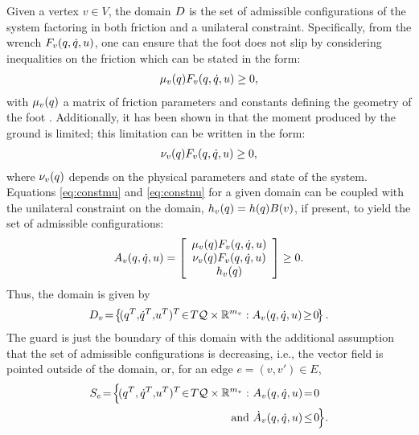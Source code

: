 Given a vertex $v \in V$, the domain $D$ is the set of admissible configurations of the system factoring in both friction and a unilateral constraint.
%
Specifically, from the wrench $F_{v}(q, \dot{q}, u)$, one can ensure that the foot does not slip by considering inequalities on the friction which can be stated in the form:
%
\begin{align}
  \label{eq:constmu}
  \mu_{v}(q) F_{v}(q, \dot{q}, u) \geq 0,
\end{align}
%
with $\mu_{v}(q)$ a matrix of friction parameters and constants defining the geometry of the foot \cite{Grizzle2010}.
%
Additionally, it has been shown in \cite{Chevallereau2009,Vukobratovic1990} that the moment produced by the ground is limited; this limitation can be written in the form:
%
\begin{align}
  \label{eq:constnu}
  \nu_{v}(q) F_{v}(q, \dot{q}, u) \geq 0,
\end{align}
%
where $\nu_{v}(q)$ depends on the physical parameters and state of the system.
%
Equations \eqref{eq:constmu} and \eqref{eq:constnu} for a given domain can be coupled with the unilateral constraint on the domain, $h_{v}(q) = h(q) B(v)$, if present, to yield the set of admissible configurations:
%
\begin{align}
  \label{admissible}
  A_{v}(q, \dot{q}, u) = \left[ \begin{array}{c}
      \mu_{v}(q) F_{v}(q, \dot{q}, u)\\
      \nu_{v}(q) F_{v}(q, \dot{q}, u)\\
      h_{v}(q)
    \end{array} \right] \geq 0.
\end{align}
%
Thus, the domain is given by
%
\begin{align}
  \label{eq:domain}
  \D_{v} \! = \! \left\{ \! (q^{T}, \! {\dot q}^{T}, \! \u^{T})^{T} \! \in \! T\Q \times \R^{m_{v}} : A_{v}\argsqdqu \! \geq \! 0 \! \right\}.
\end{align}
%
The guard is just the boundary of this domain with the additional assumption that the set of admissible configurations is decreasing, i.e., the vector field is pointed outside of the domain, or, for an edge $e = (v, v') \in E$,
%
\begin{align}
  S_{e} \! = \! \Bigl\{ \!(\q^{T}, \dq^{T}, \! \u^{T})^{T} \! \in \! T\Q \times \R^{m_v} : \ &A_{v}\argsqdqu \! = \! 0 \\
  \nonumber
  \mathrm{and} \ &{\dot A}_{v}\argsqdqu \! \leq \! 0 \! \Bigl\}.
\end{align}

